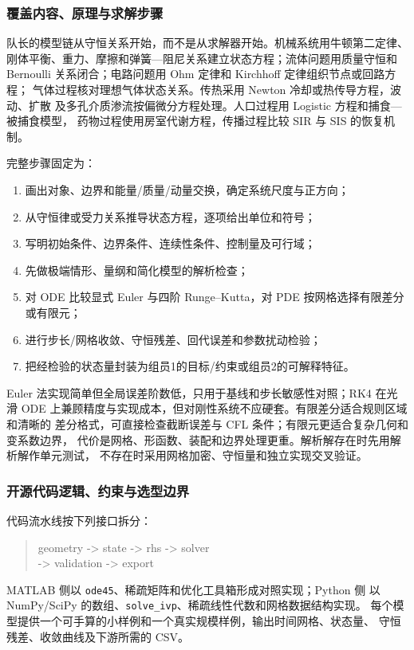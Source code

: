 \documentclass[UTF8,a4paper,12pt]{ctexart}
\begin{document}
\subsubsection{覆盖内容、原理与求解步骤}

队长的模型链从守恒关系开始，而不是从求解器开始。机械系统用牛顿第二定律、
刚体平衡、重力、摩擦和弹簧—阻尼关系建立状态方程；流体问题用质量守恒和
Bernoulli 关系闭合；电路问题用 Ohm 定律和 Kirchhoff 定律组织节点或回路方程；
气体过程核对理想气体状态关系。传热采用 Newton 冷却或热传导方程，波动、扩散
及多孔介质渗流按偏微分方程处理。人口过程用 Logistic 方程和捕食—被捕食模型，
药物过程使用房室代谢方程，传播过程比较 SIR 与 SIS 的恢复机制。

完整步骤固定为：
\begin{enumerate}
  \item 画出对象、边界和能量/质量/动量交换，确定系统尺度与正方向；
  \item 从守恒律或受力关系推导状态方程，逐项给出单位和符号；
  \item 写明初始条件、边界条件、连续性条件、控制量及可行域；
  \item 先做极端情形、量纲和简化模型的解析检查；
  \item 对 ODE 比较显式 Euler 与四阶 Runge--Kutta，对 PDE 按网格选择有限差分或有限元；
  \item 进行步长/网格收敛、守恒残差、回代误差和参数扰动检验；
  \item 把经检验的状态量封装为组员1的目标/约束或组员2的可解释特征。
\end{enumerate}

Euler 法实现简单但全局误差阶数低，只用于基线和步长敏感性对照；RK4 在光滑 ODE
上兼顾精度与实现成本，但对刚性系统不应硬套。有限差分适合规则区域和清晰的
差分格式，可直接检查截断误差与 CFL 条件；有限元更适合复杂几何和变系数边界，
代价是网格、形函数、装配和边界处理更重。解析解存在时先用解析解作单元测试，
不存在时采用网格加密、守恒量和独立实现交叉验证。

\subsubsection{开源代码逻辑、约束与选型边界}

代码流水线按下列接口拆分：
\begin{quote}
\small\ttfamily
geometry -> state -> rhs -> solver\\
-> validation -> export
\end{quote}
MATLAB 侧以 \texttt{ode45}、稀疏矩阵和优化工具箱形成对照实现；Python 侧
以 NumPy/SciPy 的数组、\texttt{solve\_ivp}、稀疏线性代数和网格数据结构实现。
每个模型提供一个可手算的小样例和一个真实规模样例，输出时间网格、状态量、
守恒残差、收敛曲线及下游所需的 CSV。
\end{document}
